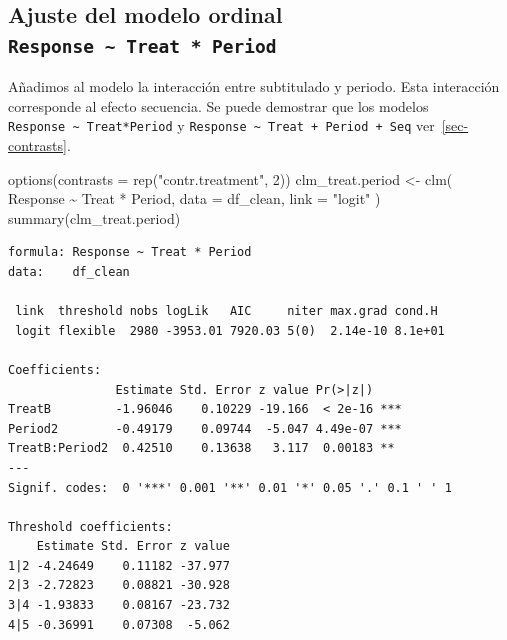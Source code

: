 \documentclass[
  12pt,
  a4paper,
  extrafontsizes,
  onecolumn,
  openright]{memoir}
\newenvironment{Shaded}{\begin{snugshade}}{\end{snugshade}}
\newcommand{\AttributeTok}[1]{\textcolor[rgb]{0.40,0.45,0.13}{#1}}
\newcommand{\DecValTok}[1]{\textcolor[rgb]{0.68,0.00,0.00}{#1}}
\newcommand{\FunctionTok}[1]{\textcolor[rgb]{0.28,0.35,0.67}{#1}}
\newcommand{\NormalTok}[1]{\textcolor[rgb]{0.00,0.23,0.31}{#1}}
\newcommand{\OtherTok}[1]{\textcolor[rgb]{0.00,0.23,0.31}{#1}}
\newcommand{\SpecialCharTok}[1]{\textcolor[rgb]{0.37,0.37,0.37}{#1}}
\newcommand{\StringTok}[1]{\textcolor[rgb]{0.13,0.47,0.30}{#1}}
\begin{document}
\hypertarget{ajuste-del-modelo-ordinal-response-treat-period-1}{%
\subsection{\texorpdfstring{Ajuste del modelo ordinal
\texttt{Response\ \textasciitilde{}\ Treat\ *\ Period}}{Ajuste del modelo ordinal Response \textasciitilde{} Treat * Period}}\label{ajuste-del-modelo-ordinal-response-treat-period-1}}

Añadimos al modelo la interacción entre subtitulado y periodo. Esta
interacción corresponde al efecto secuencia. Se puede demostrar que los
modelos \texttt{Response\ \textasciitilde{}\ Treat*Period} y
\texttt{Response\ \textasciitilde{}\ Treat\ +\ Period\ +\ Seq}
ver~\ref{sec-contrasts}.

\scriptsize

\begin{Shaded}
\begin{Highlighting}[]
\FunctionTok{options}\NormalTok{(}\AttributeTok{contrasts =} \FunctionTok{rep}\NormalTok{(}\StringTok{"contr.treatment"}\NormalTok{, }\DecValTok{2}\NormalTok{))}
\NormalTok{clm\_treat.period }\OtherTok{\textless{}{-}}
    \FunctionTok{clm}\NormalTok{(}
\NormalTok{        Response }\SpecialCharTok{\textasciitilde{}}\NormalTok{ Treat }\SpecialCharTok{*}\NormalTok{ Period,}
        \AttributeTok{data =}\NormalTok{ df\_clean, }\AttributeTok{link =} \StringTok{"logit"}
\NormalTok{    )}
\FunctionTok{summary}\NormalTok{(clm\_treat.period)}
\end{Highlighting}
\end{Shaded}

\begin{verbatim}
formula: Response ~ Treat * Period
data:    df_clean

 link  threshold nobs logLik   AIC     niter max.grad cond.H 
 logit flexible  2980 -3953.01 7920.03 5(0)  2.14e-10 8.1e+01

Coefficients:
               Estimate Std. Error z value Pr(>|z|)    
TreatB         -1.96046    0.10229 -19.166  < 2e-16 ***
Period2        -0.49179    0.09744  -5.047 4.49e-07 ***
TreatB:Period2  0.42510    0.13638   3.117  0.00183 ** 
---
Signif. codes:  0 '***' 0.001 '**' 0.01 '*' 0.05 '.' 0.1 ' ' 1

Threshold coefficients:
    Estimate Std. Error z value
1|2 -4.24649    0.11182 -37.977
2|3 -2.72823    0.08821 -30.928
3|4 -1.93833    0.08167 -23.732
4|5 -0.36991    0.07308  -5.062
\end{verbatim}
\end{document}
